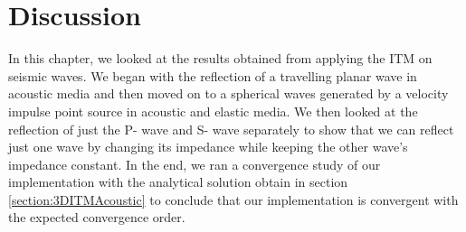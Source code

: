 \section{Discussion}
In this chapter, we looked at the results obtained from applying the \ac{ITM} on seismic waves. We began with the reflection of a travelling planar wave in acoustic media
and then moved on to a spherical waves generated by a velocity impulse point source in acoustic and elastic media. 
We then looked at the reflection of just the P- wave and S- wave separately to show that we can reflect just one wave by changing its impedance while keeping the other wave's impedance constant.
In the end, we ran a convergence study of our implementation with the analytical solution obtain in section \ref{section:3DITMAcoustic} to conclude that our implementation
is convergent with the expected convergence order. \\
